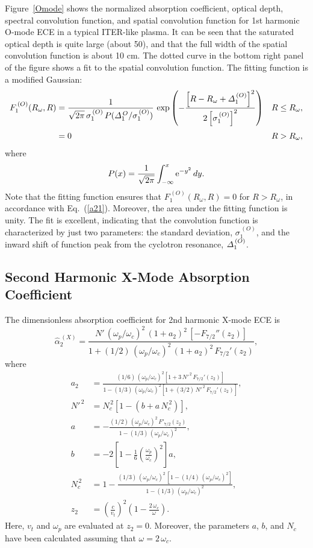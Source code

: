 \documentclass[12pt,prb,aps]{revtex4-1}
\begin{document}
Figure~\ref{Omode} shows the normalized absorption coefficient, optical depth, spectral convolution function, and spatial convolution function for
1st harmonic O-mode ECE in a typical ITER-like plasma. It can be seen that the saturated optical depth is quite large (about 50), and that the full 
width of the spatial convolution function is about 10 cm. The dotted curve in the bottom right panel of the figure shows a fit to the
spatial convolution function. The fitting function is a modified Gaussian:
\begin{align}
F_1^{\,(O)}(R_\omega,R)&= \frac{1}{\sqrt{2\pi}\,\sigma_1^{\,(O)} \,P({\mit\Delta}_1^{\,O}/\sigma_1^{\,(O)})}\,
\exp\left(-\frac{\left[R-R_\omega+{\mit\Delta}_1^{\,(O)}\right]^2}{2\left[\sigma_1^{\,(O)}\right]^2}\right)&R\leq R_\omega,\\[0.5ex]
&= 0& R>R_\omega,
\end{align}
where 
\begin{equation}
P(x) = \frac{1}{\sqrt{2\pi}}\int_{-\infty}^x{\rm e}^{-y^2}\,dy.
\end{equation}
Note that the fitting function ensures that $F_1^{\,(O)}(R_\omega,R)= 0$ for $R>R_\omega$, in accordance with Eq.~(\ref{a21}). Moreover, the area under the
fitting function is unity. 
The fit is excellent, indicating that the convolution function 
 is characterized by just two parameters: the standard deviation, $\sigma_1^{\,(O)}$, and the inward shift
of function peak from the cyclotron resonance, ${\mit\Delta}_1^{\,(O)}$. 

\subsection{Second Harmonic X-Mode  Absorption Coefficient}
The dimensionless absorption coefficient for 2nd harmonic X-mode ECE is\,\cite{bornatici}
\begin{equation}\label{a28}
\hat{\alpha}_2^{\,(X)} = \frac{N'\,(\omega_p/\omega_c)^2\,(1+a_2)^2\,[-F_{7/2}''(z_2)]}
{1+(1/2)\,(\omega_p/\omega_c)^2\,(1+a_2)^2\,F_{7/2}'(z_2)},
\end{equation}
where
\begin{align}
a_2 &= \frac{(1/6)\,(\omega_p/\omega_c)^2\left[1+3\,N'^{\,2}\,F_{7/2}'(z_2)\right]}{1- (1/3)\,(\omega_p/
\omega_c)^2\left[1+(3/2)\,N'^{\,2}\,F_{7/2}'(z_2)\right]},\\[0.5ex]
N'^{\,2} &= N_c^{\,2}\left[1-(b+a\,N_c^{\,2})\right],\\[0.5ex]
a&= - \frac{(1/2)\,(\omega_p/\omega_c)^2\,F'_{7/2}(z_2)}{1-(1/3)\,(\omega_p/\omega_c)^2},\\[0.5ex]
b &= -2\left[1-\frac{1}{6}\left(\frac{\omega_p}{\omega_c}\right)^2\right]a,\\[0.5ex]
N_c^{\,2}&= 1 -\frac{(1/3)\,(\omega_p/\omega_c)^2\,[1-(1/4)\,(\omega_p/\omega_c)^2]}{1-(1/3)\,(\omega_p/\omega_c)^2},\\[0.5ex]
z_2 &= \left(\frac{c}{v_t}\right)^2\left(1-\frac{2\,\omega_c}{\omega}\right).\label{a29}
\end{align}
Here, $v_t$ and $\omega_p$ are evaluated at $z_2=0$. Moreover, the parameters $a$, $b$, and $N_c$ have been calculated assuming that $\omega=2\,\omega_c$. 
\end{document}
